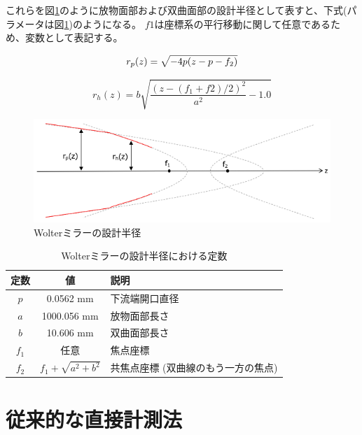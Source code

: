 \documentclass[dvipdfmx,autodetect-engine]{jreport}
\begin{document}
これらを図\ref{fig:wolter_profile}のように放物面部および双曲面部の設計半径として表すと、下式(パラメータは図\ref{tb:wolter_profile_constants})のようになる。
$f1$は座標系の平行移動に関して任意であるため、変数として表記する。

\begin{equation}
    r_p(z) = \sqrt{ -4p(z - p - f_2) } \\
\end{equation}

\begin{equation}
    r_h(z) = b \sqrt{ \frac{(z - (f_1 + f2) / 2)^2}{a^2} - 1.0 }
\end{equation}

\begin{figure}[h!]
\centering
\includegraphics[scale=0.55]{images/mirror_experiment/mirror_profile.png}
\caption{Wolterミラーの設計半径}
\label{fig:wolter_profile}
\end{figure}

\begin{table}[htb]
    \begin{center}
      \begin{tabular}{|c|c|l|} \hline
        定数 & 値 & 説明 \\ \hline
        $p$ & 0.0562 mm & 下流端開口直径 \\
        $a$ & 1000.056 mm & 放物面部長さ \\
        $b$ & 10.606 mm & 双曲面部長さ \\ 
        $f_1$ & 任意 & 焦点座標 \\
        $f_2$ & $f_1 + \sqrt{ a^2 + b^2 }$  & 共焦点座標 (双曲線のもう一方の焦点) \\\hline
      \end{tabular}
      \caption{Wolterミラーの設計半径における定数}
      \label{tb:wolter_profile_constants}
    \end{center}
\end{table}

\section{従来的な直接計測法}
\end{document}
